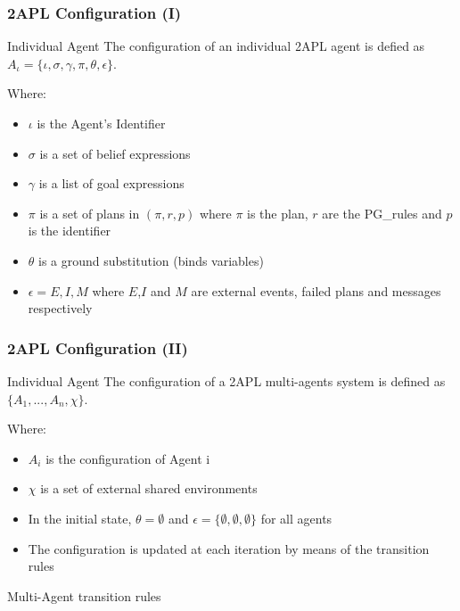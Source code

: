 \documentclass{beamer}
\begin{document}
\begin{frame}
\frametitle{2APL Configuration (I)}

\begin{block}{ Individual Agent}
The configuration of an individual 2APL agent is defied as $ A_\iota = \{\iota, \sigma, \gamma , \pi, \theta, \epsilon \} $.
\end{block}
Where:
\begin{itemize}
\item $\iota$ is the Agent's Identifier
\item $\sigma$ is a set of belief expressions
\item $\gamma$ is a list of goal expressions
\item $\pi$ is a set of plans in $(\pi, r, p)$ where $\pi$ is the plan, $r$ are the PG\_rules and $p$ is the identifier
\item $\theta$ is a ground substitution (binds variables)
\item $\epsilon = E,I,M$ where $E$,$I$ and $M$ are external events, failed plans and messages respectively
\end{itemize}

\end{frame}

\begin{frame}
\frametitle{2APL Configuration (II)}

\begin{block}{ Individual Agent}
The configuration of a 2APL multi-agents system is defined as $\{A_1,...,A_n, \chi\}$.
\end{block}
Where:
\begin{itemize}
\item $A_i$ is the configuration of Agent i
\item $\chi$ is a set of external shared environments
\item In the initial state, $\theta=\emptyset$ and $\epsilon=\{\emptyset,\emptyset,\emptyset\}$ for all agents
\item The configuration is updated at each iteration by means of the transition rules
\end{itemize}

\end{frame}

\begin{frame}
\Huge{\centerline{Multi-Agent transition rules}}
\end{frame}

\end{document}
